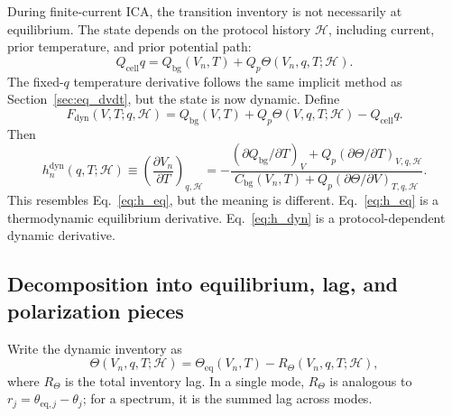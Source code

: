 \documentclass[11pt,a4paper]{article}
\newcommand{\eqs}{\mathrm{eq}}
\newcommand{\dyn}{\mathrm{dyn}}
\newcommand{\bg}{\mathrm{bg}}
\newcommand{\cell}{\mathrm{cell}}
\newcommand{\calH}{\mathcal H}
\begin{document}
During finite-current ICA, the transition inventory is not necessarily at equilibrium. The state depends on the
protocol history \(\calH\), including current, prior temperature, and prior potential path:
\begin{equation}
Q_{\cell}q
=
Q_{\bg}(V_n,T)+Q_p\Theta(V_n,q,T;\calH).
\label{eq:dyn_balance}
\end{equation}
The fixed-\(q\) temperature derivative follows the same implicit method as Section~\ref{sec:eq_dvdt}, but the
state is now dynamic. Define
\begin{equation}
F_{\dyn}(V,T;q,\calH)
=
Q_{\bg}(V,T)+Q_p\Theta(V,q,T;\calH)-Q_{\cell}q.
\label{eq:Fdyn}
\end{equation}
Then
\begin{equation}
h_n^{\dyn}(q,T;\calH)
\equiv
\left(\frac{\partial V_n}{\partial T}\right)_{q,\calH}
=
-\frac{
\left(\partial Q_{\bg}/\partial T\right)_V
+Q_p\left(\partial\Theta/\partial T\right)_{V,q,\calH}}
{C_{\bg}(V_n,T)+Q_p\left(\partial\Theta/\partial V\right)_{T,q,\calH}}.
\label{eq:h_dyn}
\end{equation}
This resembles Eq.~\eqref{eq:h_eq}, but the meaning is different. Eq.~\eqref{eq:h_eq} is a thermodynamic
equilibrium derivative. Eq.~\eqref{eq:h_dyn} is a protocol-dependent dynamic derivative.

\subsection{Decomposition into equilibrium, lag, and polarization pieces}\label{sec:decomp}

Write the dynamic inventory as
\begin{equation}
\Theta(V_n,q,T;\calH)
=
\Theta_{\eqs}(V_n,T)-R_{\Theta}(V_n,q,T;\calH),
\label{eq:Theta_lag}
\end{equation}
where \(R_{\Theta}\) is the total inventory lag. In a single mode, \(R_{\Theta}\) is analogous to
\(r_j=\theta_{\eqs,j}-\theta_j\); for a spectrum, it is the summed lag across modes.
\end{document}
